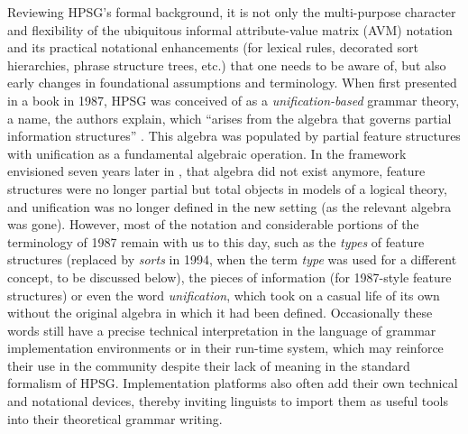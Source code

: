 \documentclass[output=paper
 	        ,biblatex
                ,babelshorthands
                ,newtxmath
                ,draftmode
                ,colorlinks, citecolor=brown
]{langscibook}
\begin{document}
Reviewing\label{formal:page-unification-start} HPSG's formal background,
it is not only the multi-purpose character and flexibility of the ubiquitous informal attribute-value matrix (AVM) notation and its
practical notational enhancements (for lexical rules, decorated sort
hierarchies, phrase structure trees, etc.) that one needs to be
aware of, but also early changes in
foundational assumptions and terminology.
When first presented in a book in 1987, HPSG was conceived of as a
\emph{unification-based} grammar theory, a name, the authors
explain, which ``arises from the algebra that governs partial
information structures'' \citep[7]{PollardSag1987}. This algebra was
populated by partial feature structures with unification as a
fundamental algebraic operation. In the framework envisioned seven
years later in \citet{PollardSag1994},
that algebra did not exist anymore, feature structures were no longer
partial but total objects in models of a logical theory, and
unification was no longer defined in the new setting (as the relevant
algebra was gone). However, most of the notation and considerable
portions of the terminology of 1987 remain with us to this day, such as the
\emph{types} of feature structures (replaced by
\emph{sorts} in 1994,
when the term \emph{type} was used for a different concept, to be
discussed below), the pieces of information (for 1987-style feature
structures) or even the word \emph{unification}, which took on a
casual life of its own without the original algebra in
which it had been defined. Occasionally these words still have a
precise technical interpretation in the language of grammar
implementation environments or in their run-time system, which may
reinforce their use in the community despite their lack of meaning in
the standard formalism of HPSG. Implementation platforms also often add
their own technical and notational devices, thereby
inviting linguists to import them as useful tools into their theoretical grammar
writing.\label{formal:page-unification-end}


\end{document}
